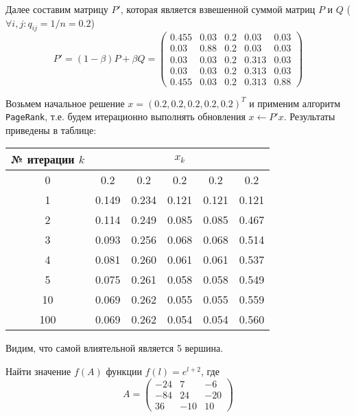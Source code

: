 Далее составим матрицу $P'$, которая является взвешенной суммой матриц $P$ и
$Q$ ($\forall i, j: q_{ij} = 1/n = 0.2$)
\begin{equation*}
    P' = (1 - \beta) P + \beta Q =
    \begin{pmatrix}
        0.455 & 0.03 & 0.2 & 0.03 & 0.03\\
        0.03 & 0.88 & 0.2 & 0.03 & 0.03\\
        0.03 & 0.03 & 0.2 & 0.313 & 0.03\\
        0.03 & 0.03 & 0.2 & 0.313 & 0.03\\
        0.455 & 0.03 & 0.2 & 0.313 & 0.88
    \end{pmatrix}
\end{equation*}

Возьмем начальное решение $x = (0.2, 0.2, 0.2, 0.2, 0.2)^T$ и применим алгоритм
\texttt{PageRank}, т.е. будем итерационно выполнять обновления
$x \leftarrow P'x$. Результаты приведены в таблице:
\begin{center}
    \begin{tabular}{c|c|c|c|c|c}
        № итерации $k$ & \multicolumn{5}{|c}{$x_k$}\\
        \hline
        0 & 0.2 & 0.2 & 0.2 & 0.2 & 0.2\\
        \hline
        1 & 0.149 & 0.234 & 0.121 & 0.121 & 0.121\\
        \hline
        2 & 0.114 & 0.249 & 0.085 & 0.085 & 0.467\\
        \hline
        3 & 0.093 & 0.256 & 0.068 & 0.068 & 0.514\\
        \hline
        4 & 0.081 & 0.260 & 0.061 & 0.061 & 0.537\\
        \hline
        5 & 0.075 & 0.261 & 0.058 & 0.058 & 0.549\\
        \hline
        10 & 0.069 & 0.262 & 0.055 & 0.055 & 0.559\\
        \hline
        100 & 0.069 & 0.262 & 0.054 & 0.054 & 0.560
    \end{tabular}
\end{center}
Видим, что самой влиятельной является 5 вершина.


\newpage
\begin{problem}
    Найти значение $f(A)$ функции $f(l) = e^{l+2}$, где
    \begin{equation*}
        A = \begin{pmatrix}
            -24 & 7 & -6\\
            -84 & 24 & -20\\
            36 & -10 & 10
        \end{pmatrix}
    \end{equation*}
\end{problem}

